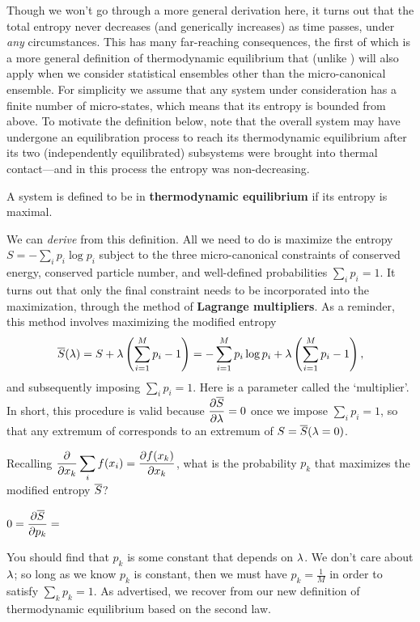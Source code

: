 Though we won't go through a more general derivation here, it turns out that the total entropy never decreases (and generically increases) as time passes, under \textit{any} circumstances.
This has many far-reaching consequences, the first of which is a more general definition of thermodynamic equilibrium that (unlike ) will also apply when we consider statistical ensembles other than the micro-canonical ensemble.
For simplicity we assume that any system under consideration has a finite number of micro-states, which means that its entropy is bounded from above.
To motivate the definition below, note that the overall system \Om may have undergone an equilibration process to reach its thermodynamic equilibrium after its two (independently equilibrated) subsystems were brought into thermal contact---and in this process the entropy was non-decreasing.

\begin{shaded}
  A system is defined to be in \textbf{thermodynamic equilibrium} if its entropy is maximal.
\end{shaded}

We can \textit{derive}  from this definition.
All we need to do is maximize the entropy $S = - \sum_i p_i \log p_i$ subject to the three micro-canonical constraints of conserved energy, conserved particle number, and well-defined probabilities $\sum_i p_i = 1$.
It turns out that only the final constraint needs to be incorporated into the maximization, through the method of \textbf{Lagrange multipliers}.
As a reminder, this method involves maximizing the modified entropy
\begin{equation*}
  \overline S(\lambda) = S + \lambda\left(\sum_{i = 1}^M p_i - 1\right) = - \sum_{i = 1}^M p_i \log p_i + \lambda\left(\sum_{i = 1}^M p_i - 1\right),
\end{equation*}
and subsequently imposing $\sum_i p_i = 1$.
Here \la is a parameter called the `multiplier'.
In short, this procedure is valid because $\displaystyle \frac{\partial \overline S}{\partial \lambda} = 0$ once we impose $\sum_i p_i = 1$, so that any extremum of \Sbar corresponds to an extremum of $S = \overline S(\lambda = 0)$.

Recalling $\displaystyle \frac{\partial }{\partial x_k} \sum_i f(x_i) = \frac{\partial f(x_k)}{\partial x_k}$, what is the probability $p_k$ that maximizes the modified entropy $\overline S$?
\begin{mdframed}
  $\displaystyle 0 = \frac{\partial \overline S}{\partial p_k} = $ \\[100 pt]
\end{mdframed}
You should find that $p_k$ is some constant that depends on $\lambda$.
We don't care about $\lambda$; so long as we know $p_k$ is constant, then we must have $p_k = \frac{1}{M}$ in order to satisfy $\sum_k p_k = 1$.
As advertised, we recover  from our new definition of thermodynamic equilibrium based on the second law.



